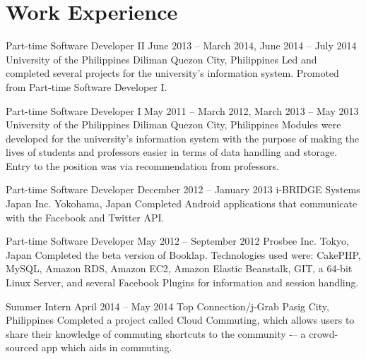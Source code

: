 \section*{Work Experience}

\employment
	{Part-time Software Developer II}
	{June 2013 -- March 2014, June 2014 -- July 2014}
	{University of the Philippines Diliman}
	{Quezon City, Philippines}
	{Led and completed several projects for the university's information system. Promoted from Part-time Software Developer I.}

\employment
	{Part-time Software Developer I}
	{May 2011 -- March 2012, March 2013 -- May 2013}
	{University of the Philippines Diliman}
	{Quezon City, Philippines}
	{Modules were developed for the university's information system with the purpose of making the lives of students and professors easier in terms of data handling and storage. Entry to the position was via recommendation from professors.}

\employment
	{Part-time Software Developer}
	{December 2012 -- January 2013}
	{i-BRIDGE Systems Japan Inc.}
	{Yokohama, Japan}
	{Completed Android applications that communicate with the Facebook and Twitter API.}

\employment
	{Part-time Software Developer}
	{May 2012 -- September 2012}
	{Prosbee Inc.}
	{Tokyo, Japan}
	{Completed the beta version of Booklap. Technologies used were: CakePHP, MySQL, Amazon RDS, Amazon EC2, Amazon Elastic Beanstalk, GIT, a 64-bit Linux Server, and several Facebook Plugins for information and session handling.}

\employment
	{Summer Intern}
	{April 2014 -- May 2014}
	{Top Connection/j-Grab}
	{Pasig City, Philippines}
	{Completed a project called Cloud Commuting, which allows users to share their knowledge of commuting shortcuts to the community -– a crowd-sourced app which aids in commuting.}